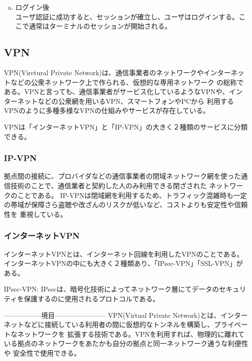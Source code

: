 \documentclass[12pt,a4paper,titlepage]{jsarticle}
\begin{document}
\begin{enumerate}[(a)]
\begin{enumerate}[(1)]
    \end{enumerate}
    \item ログイン後\mbox{}\\
    ユーザ認証に成功すると、セッションが確立し、ユーザはログインする。ここで通常はターミナルのセッションが開始される。
    
\end{enumerate}






\subsection{VPN}
VPN(Viretural Private Network)は、通信事業者のネットワークやインターネットなどの公衆ネットワーク上で作られる、仮想的な専用ネットワーク
の総称である。VPNと言っても、通信事業者がサービス化しているようなVPNや、インターネットなどの公衆網を用いるVPN、スマートフォンやPCから
利用するVPNのように多種多様なVPNの仕組みやサービスが存在している。

VPNは「インターネットVPN」と「IP-VPN」の大きく２種類のサービスに分類できる。
\subsubsection*{IP-VPN}
拠点間の接続に、プロバイダなどの通信事業者の閉域ネットワーク網を使った通信技術のことで、通信業者と契約した人のみ利用できる閉ざされた
ネットワークのことである。
IP-VPNは閉域網を利用するため、トラフィック混雑時も一定の帯域が保障さら盗聴や改ざんのリスクが低いなど、コストよりも安定性や信頼性を
重視している。

\subsubsection*{インターネットVPN}
インターネットVPNとは、インターネット回線を利用したVPNのことである。\\
インターネットVPNの中にも大きく２種類あり、「IPsec-VPN」「SSL-VPN」がある。

IPsec-VPN:
IPsecは、暗号化技術によってネットワーク層にてデータのセキュリティを保護するのに使用されるプロトコルである。



-----------------境目-----------------------
VPN(Virtual Private Network)とは、インターネットなどに接続している利用者の間に仮想的なトンネルを構築し、プライベートなネットワークを
拡張する技術である。VPNを利用すれば、物理的に離れている拠点のネットワークをあたかも自分の拠点と同一ネットワーク通うな利便性や
安全性で使用できる。
\end{document}
